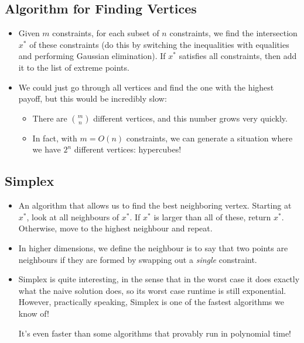 \begin{itemize}

\end{itemize}

\subsection{Algorithm for Finding Vertices}
\begin{itemize}
	\item Given $m$ constraints, for each subset of $n$ constraints, we find the intersection $x^*$ of these 
		constraints (do this by switching the inequalities with equalities and performing Gaussian elimination).
		If $x^*$ satisfies all constraints, then add it to the list of extreme points.  
	\item We could just go through all vertices and find the one with the highest payoff, but this would 
		be incredibly slow:
		\begin{itemize}
			\item There are \( m \choose n \) different vertices, and this number grows very quickly.   
			\item In fact, with $m = O(n)$ constraints, we can generate a situation where we have $2^n$ 
				different vertices: hypercubes!
		\end{itemize}
\end{itemize}
\subsection{Simplex}
\begin{itemize}
	\item  An algorithm that allows us to find the best neighboring vertex. Starting at $x^*$, look at all 
		neighbours of $x^*$. If $x^*$ is larger than all of these, return $x^*$. Otherwise, 
		move to the highest neighbour and repeat. 
	\item In higher dimensions, we define the neighbour is to say that two points are neighbours if they are 
		formed by swapping out a \textit{single} constraint. 
	\item Simplex is quite interesting, in the sense that in the worst case it does exactly what the naive 
		solution does, so its worst case runtime is still exponential. However, practically speaking, 
		Simplex is one of the fastest algorithms we know of!  

		It's even faster than some algorithms that provably run in polynomial time!   
\end{itemize}
